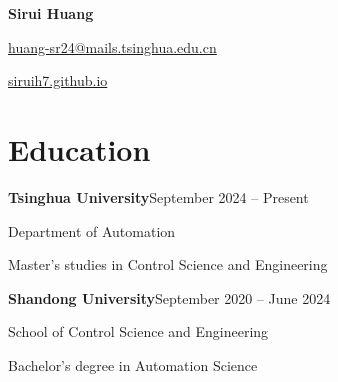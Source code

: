 \documentclass[11pt,a4paper]{article}
\begin{document}
{\LARGE\bfseries Sirui Huang}\par
\vspace{0.5em}
\href{mailto:huang-sr24@mails.tsinghua.edu.cn}{huang-sr24@mails.tsinghua.edu.cn}\par
\href{https://siruih7.github.io/}{siruih7.github.io}
\section*{Education}
\textbf{Tsinghua University}\hfill September 2024 -- Present\par
Department of Automation\par
Master's studies in Control Science and Engineering
\vspace{1em}

\textbf{Shandong University}\hfill September 2020 -- June 2024\par
School of Control Science and Engineering\par
Bachelor's degree in Automation Science
\end{document}
